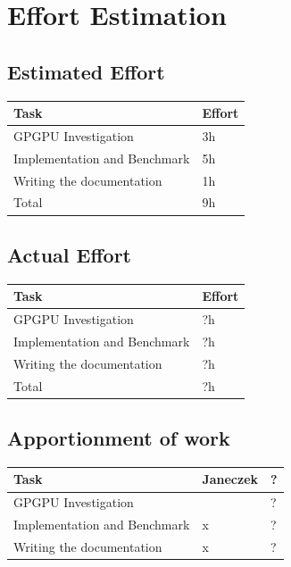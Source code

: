 \documentclass[11pt, a4paper]{article}
\begin{document}
\section{Effort Estimation}
\subsection{Estimated Effort}

\begin{center}
  \begin{tabular}{| l | l |}
		\hline
	    Task & Effort  \\ \hline
		GPGPU Investigation & 3h \\ \hline
	    Implementation and Benchmark  & 5h  \\ \hline 
		Writing the documentation & 1h\\ \hline \hline
		Total & 9h \\ \hline
  \end{tabular}
\end{center}

\subsection{Actual Effort}

\begin{center}
  \begin{tabular}{| l | l |}
		\hline
		Task & Effort  \\ \hline
		GPGPU Investigation & ?h \\ \hline
		Implementation and Benchmark  & ?h  \\ \hline 
		Writing the documentation & ?h\\ \hline \hline
		Total & ?h \\ \hline
  \end{tabular}
\end{center}

\subsection{Apportionment of work}
\begin{center}
  \begin{tabular}{| l | l | l |}
    \hline
    Task & Janeczek & ?  \\ \hline
	GPGPU Investigation &  & ? \\ \hline
	Implementation and Benchmark& x & ? \\ \hline
    Writing the documentation & x  & ?  \\ \hline 
  \end{tabular}
\end{center}
\end{document}
